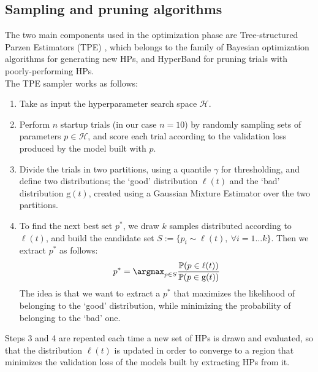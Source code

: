 
\subsection{Sampling and pruning algorithms} %
\noindent
The two main components used in the optimization phase are Tree-structured Parzen Estimators (TPE) \cite{bergstra2011algorithms}, which belongs to the family of Bayesian optimization algorithms for generating new HPs, and HyperBand \cite{li2018hyperband} for pruning trials with poorly-performing HPs.\\
The TPE sampler works as follows:
\begin{enumerate}
    \item Take as input the hyperparameter search space $\mathcal{H}$.
    \item Perform $n$ startup trials (in our case $n = 10$) by randomly sampling sets of parameters $p\in\mathcal{H}$, and score each trial according to the validation loss produced by the model built with $p$.
    \item Divide the trials in two partitions, using a quantile $\gamma$ for thresholding, and define two distributions; the `good' distribution $\ell(t)$ and the `bad' distribution $\mathrm{g}(t)$, created using a Gaussian Mixture Estimator over the two partitions.
    \item To find the next best set $p^*$, we draw $k$ samples distributed according to $\ell(t)$, and build the candidate set $S :=\{p_i\sim\ell(t),~\forall i = 1\dots k\}$. Then we extract $p^*$ as follows:
    $$ 
        p^* = \argmax_{p\in S} \frac{\mathbb{P}(p\in\ell(t))}{\mathbb{P}(p\in\mathrm{g}(t))}
    $$
    The idea is that we want to extract a $p^*$ that maximizes the likelihood of belonging to the `good' distribution, while minimizing the probability of belonging to the `bad' one.
\end{enumerate}

\noindent
Steps 3 and 4 are repeated each time a new set of HPs is drawn and evaluated, so that the distribution $\ell(t)$ is updated in order to converge to a region that minimizes the validation loss of the models built by extracting HPs from it.\\


